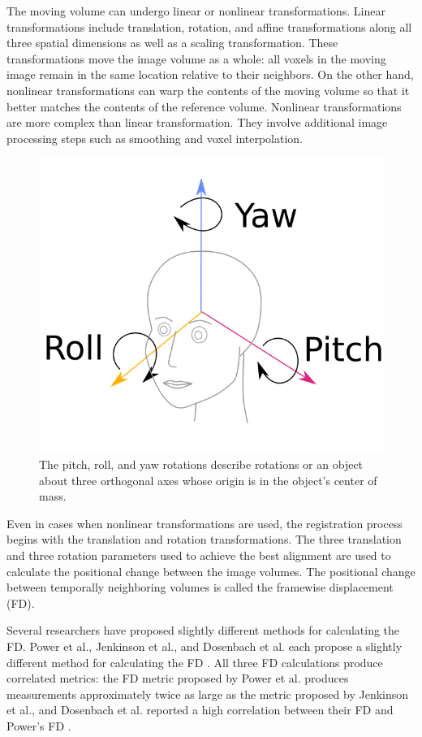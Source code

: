 The moving volume can undergo linear or nonlinear transformations. Linear transformations include translation, rotation, and affine transformations along all three spatial dimensions as well as a scaling transformation. These transformations move the image volume as a whole: all voxels in the moving image remain in the same location relative to their neighbors. On the other hand, nonlinear transformations can warp the contents of the moving volume so that it better matches the contents of the reference volume. Nonlinear transformations are more complex than linear transformation. They involve additional image processing steps such as smoothing and voxel interpolation.

\begin{figure}
\centering
\includegraphics[width=.6\textwidth]{2/pitch_roll_yaw.png}
\caption{The pitch, roll, and yaw rotations describe rotations or an object about three orthogonal axes whose origin is in the object's center of mass.}
\label{fig:pry}
\end{figure} 

Even in cases when nonlinear transformations are used, the registration process begins with the translation and rotation transformations. The three translation and three rotation parameters used to achieve the best alignment are used to calculate the positional change between the image volumes. The positional change between temporally neighboring volumes is called the framewise displacement (FD).  

Several researchers have proposed slightly different methods for calculating the FD. Power et al., Jenkinson et al., and Dosenbach et al. each propose a slightly different method for calculating the FD \cite{Power2012} \cite{Jenkinson2002} \cite{Dosenbach2017}. All three FD calculations produce correlated metrics: the FD metric proposed by Power et al. produces measurements approximately twice as large as the metric proposed by Jenkinson et al., and Dosenbach et al. reported a high correlation between their FD and Power’s FD \cite{Yan2013a} \cite{Dosenbach2017}. 

